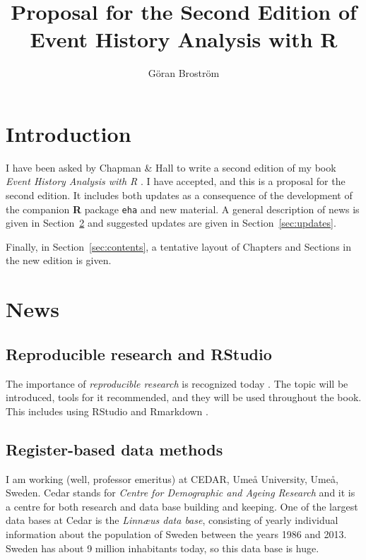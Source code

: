 \documentclass[a4paper,11pt]{article}
\title{Proposal for the Second Edition of \\
  Event History Analysis with R}
\author{Göran Broström}
\begin{document}
\maketitle

\tableofcontents

\section{Introduction}

I have been asked by Chapman \& Hall to write a second edition of my book
\emph{Event History Analysis with R} \citep{ehar12}. I have accepted, and
this is a proposal for the second edition. It includes both updates as a
consequence of the development of the companion {\bf R} \citep{cran}
package {\tt eha} \citep{eha} and new material. A general description of
news is given in Section~\ref{sec:news} and suggested updates are given in
Section~\ref{sec:updates}.

Finally, in Section~\ref{sec:contents}, a tentative layout of Chapters and
Sections in the new edition is given.

\section{News} \label{sec:news}

\subsection{Reproducible research and RStudio}

The importance of \emph{reproducible research} is recognized today
\citep{gandrud15,vsflrp}. The topic will be introduced,  tools for it
recommended, and they will be used throughout the book. This includes using 
RStudio \citep{rstudio} and Rmarkdown \citep{rmarkdown}.

\subsection{Register-based data methods}

I am working (well, professor emeritus) at {\sc CEDAR}, Umeå University,
Umeå, Sweden. {\sc Cedar} 
stands for  \emph{Centre for Demographic and Ageing Research} and it is a
centre for both research and data base building and keeping. One of the
largest data bases at {\sc Cedar} is the \emph{Linn{\ae}us data base},
consisting of yearly individual information about the population of Sweden
between the years 1986 and 2013. Sweden has about 9 million inhabitants
today, so this data base is huge.
\end{document}

